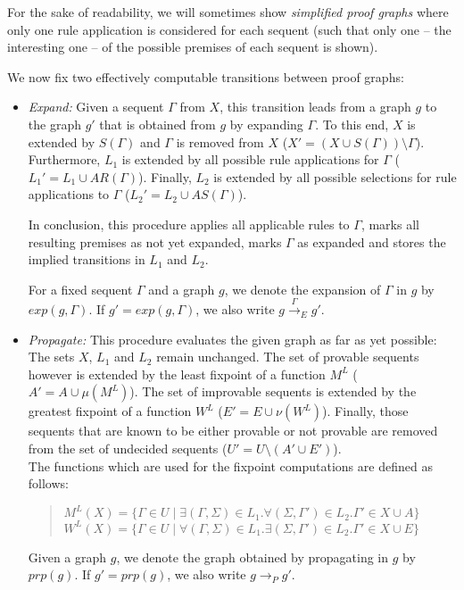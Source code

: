 \documentclass{llncs}
\begin{document}
For the sake of readability, we will sometimes show \emph{simplified proof graphs} where only one rule application
is considered for each sequent (such that only one -- the interesting one -- of the possible premises of each sequent is shown).

We now fix two effectively computable transitions between proof graphs:

\begin{itemize}
\item \emph{Expand:} Given a sequent $\Gamma$ from $X$, this transition leads from a graph
$g$ to the graph $g'$ that is
obtained from $g$ by expanding $\Gamma$. To this end, $X$ is extended by $S(\Gamma)$ and
$\Gamma$ is removed from $X$ ($X'=(X\cup S(\Gamma))\setminus \Gamma$).
Furthermore, $L_1$ is extended by all possible rule applications for $\Gamma$
($L_1'=L_1 \cup AR(\Gamma)$). Finally, $L_2$ is extended by all possible selections
for rule applications to $\Gamma$ ($L_2'=L_2\cup AS(\Gamma)$).

In conclusion, this procedure applies all applicable rules to $\Gamma$, marks all resulting 
premises as not yet expanded, marks $\Gamma$ as expanded and stores the implied transitions in
$L_1$ and $L_2$.

For a fixed sequent $\Gamma$ and a graph $g$, we denote the expansion of $\Gamma$ in $g$ by
$exp(g,\Gamma)$. If $g'=exp(g,\Gamma)$, we also write $g\stackrel{\Gamma}\rightarrow_E g'$.

\item \emph{Propagate:} This procedure evaluates the given graph as far as yet possible: The sets
$X$, $L_1$ and $L_2$ remain unchanged. The set of provable sequents however is extended by the least
fixpoint of a function $M^L$ ($A'=A\cup\mu(M^L)$). The set of improvable sequents is extended by the
greatest fixpoint of a function $W^L$ ($E'=E\cup\nu(W^L)$). Finally, those sequents that are known to be
either provable or not provable are removed from the set of undecided sequents
($U'=U\setminus(A'\cup E')$).\\

The functions which are used for the fixpoint computations are defined as follows:\\

\begin{quote}
$M^L(X)=\{\Gamma\in U\mid\exists(\Gamma,\Sigma)\in L_1.\forall (\Sigma,\Gamma')\in L_2. \Gamma'\in X\cup A\}$\\
$W^L(X)=\{\Gamma\in U\mid\forall(\Gamma,\Sigma)\in L_1.\exists (\Sigma,\Gamma')\in L_2. \Gamma'\in X\cup E\}$\\
\end{quote}

Given a graph $g$, we denote the graph obtained by propagating in $g$ by
$prp(g)$. If $g'=prp(g)$, we also write $g\rightarrow_P g'$.

\end{itemize}
\end{document}
